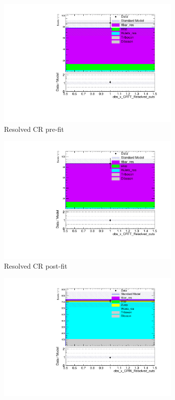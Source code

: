 \begin{figure}[htbp]
\begin{subfigure}{0.49\textwidth}
	     \includegraphics[width = 0.98\textwidth]{Figures/5/bkg_only/CRTT_Resolved_cuts_beforeFit.pdf}
	     \caption{Resolved CR \ttbar pre-fit}
	     \end{subfigure}
	     \begin{subfigure}{0.49\textwidth}
	     \includegraphics[width = 0.98\textwidth]{Figures/5/bkg_only/CRTT_Resolved_cuts_afterFit.pdf}
	     \caption{Resolved CR \ttbar post-fit}
	     \end{subfigure}
	     \begin{subfigure}{0.49\textwidth}
	     \includegraphics[width = 0.98\textwidth]{Figures/5/bkg_only/CRW_Resolved_cuts_beforeFit.pdf}

\end{subfigure}
\end{figure}
